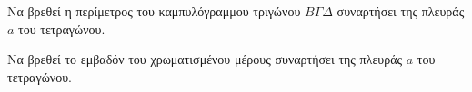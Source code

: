 \documentclass[twoside,nofonts,ektypwsh,math,spyros]{frontisthrio-diag}
\begin{document}
\begin{thema}
\begin{center}
\end{center}
\begin{erwthma}
\item Να βρεθεί η περίμετρος του καμπυλόγραμμου τριγώνου $ B\varGamma\varDelta $ συναρτήσει της πλευράς $ a $ του τετραγώνου.\\
\item Να βρεθεί το εμβαδόν του χρωματισμένου μέρους συναρτήσει της πλευράς $ a $ του τετραγώνου.\\
\end{erwthma}
\end{thema}
\kaliepityxia
\end{document}
